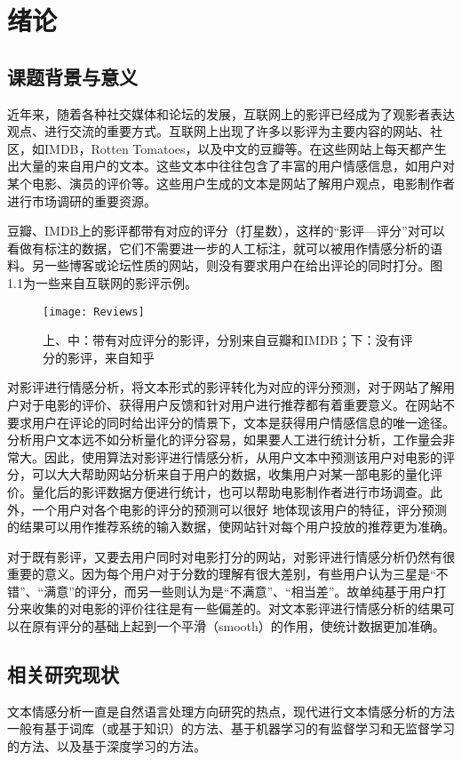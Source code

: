 \chapter{绪论}

\section{课题背景与意义}
近年来，随着各种社交媒体和论坛的发展，互联网上的影评已经成为了观影者表达观点、进行交流的重要方式。互联网上出现了许多以影评为主要内容的网站、社区，如IMDB，Rotten Tomatoes，以及中文的豆瓣等。在这些网站上每天都产生出大量的来自用户的文本。这些文本中往往包含了丰富的用户情感信息，如用户对某个电影、演员的评价等。这些用户生成的文本是网站了解用户观点，电影制作者进行市场调研的重要资源。

豆瓣、IMDB上的影评都带有对应的评分（打星数），这样的“影评—评分”对可以看做有标注的数据，它们不需要进一步的人工标注，就可以被用作情感分析的语料。另一些博客或论坛性质的网站，则没有要求用户在给出评论的同时打分。图1.1为一些来自互联网的影评示例。
\begin{figure}[ht]
\centering
\texttt{[image: Reviews]}
\caption{上、中：带有对应评分的影评，分别来自豆瓣和IMDB；下：没有评分的影评，来自知乎} \label{fig:Reviews}
\end{figure}

对影评进行情感分析，将文本形式的影评转化为对应的评分预测，对于网站了解用户对于电影的评价、获得用户反馈和针对用户进行推荐都有着重要意义。在网站不要求用户在评论的同时给出评分的情景下，文本是获得用户情感信息的唯一途径。分析用户文本远不如分析量化的评分容易，如果要人工进行统计分析，工作量会非常大。因此，使用算法对影评进行情感分析，从用户文本中预测该用户对电影的评分，可以大大帮助网站分析来自于用户的数据，收集用户对某一部电影的量化评价。量化后的影评数据方便进行统计，也可以帮助电影制作者进行市场调查。此外，一个用户对各个电影的评分的预测可以很好 地体现该用户的特征，评分预测的结果可以用作推荐系统的输入数据，使网站针对每个用户投放的推荐更为准确。

对于既有影评，又要去用户同时对电影打分的网站，对影评进行情感分析仍然有很重要的意义。因为每个用户对于分数的理解有很大差别，有些用户认为三星是“不错”、“满意”的评分，而另一些则认为是“不满意”、“相当差”。故单纯基于用户打分来收集的对电影的评价往往是有一些偏差的。对文本影评进行情感分析的结果可以在原有评分的基础上起到一个平滑（smooth）的作用，使统计数据更加准确。



\section{相关研究现状}
文本情感分析一直是自然语言处理方向研究的热点，现代进行文本情感分析的方法一般有基于词库（或基于知识）的方法、基于机器学习的有监督学习和无监督学习的方法、以及基于深度学习的方法。

